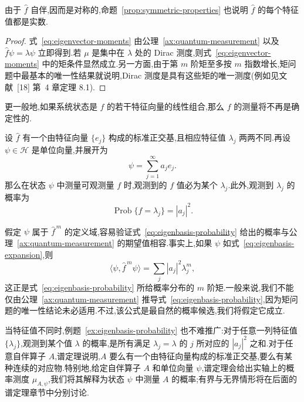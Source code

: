 由于 \(\widehat f\) 自伴,因而是对称的,命题~\ref{prop:symmetric-properties} 也说明 \(\widehat f\) 的每个特征值都是实数.

\begin{proof}
式~\eqref{eq:eigenvector-moments} 由公理~\ref{ax:quantum-measurement} 以及 \(\widehat f\psi=\lambda\psi\) 立即得到.若 \(\mu\) 是集中在 \(\lambda\) 处的 Dirac 测度,则式~\eqref{eq:eigenvector-moments} 中的矩条件显然成立.另一方面,由于第 \(m\) 阶矩至多按 \(m\) 指数增长,矩问题中最基本的唯一性结果就说明,Dirac 测度是具有这些矩的唯一测度(例如见文献~[18] 第~4 章定理 8.1).
\end{proof}

更一般地,如果系统状态是 \(\widehat f\) 的若干特征向量的线性组合,那么 \(f\) 的测量将不再是确定性的.

\begin{example}[特征向量展开与测量概率]\label{ex:eigenbasis-probability}
设 \(\widehat f\) 有一个由特征向量 \(\{e_{j}\}\) 构成的标准正交基,且相应特征值 \(\lambda_{j}\) 两两不同.再设 \(\psi\in\mathcal{H}\) 是单位向量,并展开为
\begin{equation}
\psi=\sum_{j=1}^{\infty}a_{j}e_{j}.
\label{eq:eigenbasis-expansion}
\end{equation}
那么在状态 \(\psi\) 中测量可观测量 \(f\) 时,观测到的 \(f\) 值必为某个 \(\lambda_{j}\).此外,观测到 \(\lambda_{j}\) 的概率为
\begin{equation}
\operatorname{Prob}\{f=\lambda_{j}\}=|a_{j}|^{2}.
\label{eq:eigenbasis-probability}
\end{equation}
\end{example}

假定 \(\psi\) 属于 \(\widehat f^{\,m}\) 的定义域,容易验证式~\eqref{eq:eigenbasis-probability} 给出的概率与公理~\ref{ax:quantum-measurement} 的期望值相容.事实上,如果 \(\psi\) 如式~\eqref{eq:eigenbasis-expansion},则
\[
\langle\psi,\widehat f^{\,m}\psi\rangle
=\sum_{j}|a_{j}|^{2}\lambda_{j}^{m},
\]
这正是式~\eqref{eq:eigenbasis-probability} 所给概率分布的 \(m\) 阶矩.一般来说,我们不能仅由公理~\ref{ax:quantum-measurement} 推导式~\eqref{eq:eigenbasis-probability},因为矩问题的唯一性结论未必适用.不过,该公式是最自然的概率候选,我们将假定它成立.

当特征值不同时,例题~\ref{ex:eigenbasis-probability} 也不难推广:对于任意一列特征值 \(\{\lambda_{j}\}\),观测到某个值 \(\lambda\) 的概率,是所有满足 \(\lambda_{j}=\lambda\) 的 \(j\) 所对应的 \(|a_{j}|^{2}\) 之和.对于任意自伴算子 \(A\),谱定理说明,\(A\) 要么有一个由特征向量构成的标准正交基,要么有某种连续的对应物.特别地,给定自伴算子 \(A\) 和单位向量 \(\psi\),谱定理会给出实轴上的概率测度 \(\mu_{A,\psi}\),我们将其解释为状态 \(\psi\) 中测量 \(A\) 的概率;有界与无界情形将在后面的谱定理章节中分别讨论.


